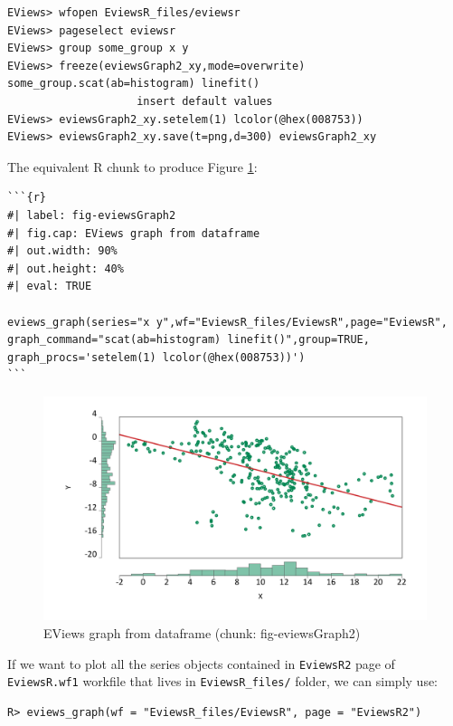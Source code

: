 \begin{verbatim}
EViews> wfopen EviewsR_files/eviewsr
EViews> pageselect eviewsr
EViews> group some_group x y
EViews> freeze(eviewsGraph2_xy,mode=overwrite) some_group.scat(ab=histogram) linefit()
                    insert default values
EViews> eviewsGraph2_xy.setelem(1) lcolor(@hex(008753))
EViews> eviewsGraph2_xy.save(t=png,d=300) eviewsGraph2_xy
\end{verbatim}

The equivalent R chunk to produce Figure \ref{fig:fig-eviewsGraph2}:

\begin{verbatim}
```{r} 
#| label: fig-eviewsGraph2
#| fig.cap: EViews graph from dataframe  
#| out.width: 90%
#| out.height: 40%
#| eval: TRUE

eviews_graph(series="x y",wf="EviewsR_files/EviewsR",page="EviewsR",
graph_command="scat(ab=histogram) linefit()",group=TRUE,
graph_procs='setelem(1) lcolor(@hex(008753))')
```
\end{verbatim}

\begin{figure}

{\centering \includegraphics[width=0.9\linewidth,height=0.4\textheight]{figures/eviewsgraph2-eviewsr-xy} 

}

\caption{EViews graph from dataframe (chunk: fig-eviewsGraph2)}\label{fig:fig-eviewsGraph2}
\end{figure}

If we want to plot all the series objects contained in \texttt{EviewsR2} page of \texttt{EviewsR.wf1} workfile that lives in \texttt{EviewsR\_files/} folder, we can simply use:

\begin{verbatim}
R> eviews_graph(wf = "EviewsR_files/EviewsR", page = "EviewsR2")
\end{verbatim}

